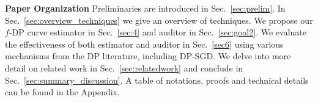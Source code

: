 

$ $\\[-1.5ex]
\noindent \textbf{Paper Organization} 
Preliminaries are introduced in Sec.~\ref{sec:prelim}. In Sec.~\ref{sec:overview_techniques} we give an overview of techniques. We propose our $f$-DP curve estimator in Sec.~\ref{sec:4} and auditor in Sec.~\ref{sec:goal2}. We evaluate the effectiveness of both estimator and auditor %
in Sec.~\ref{sec6} using various mechanisms from the DP literature, including DP-SGD. We delve into more detail on related work in Sec.~\ref{sec:relatedwork} and conclude in Sec.~\ref{sec:summary_discussion}. A table of notations, proofs and technical details can be found in the Appendix.

